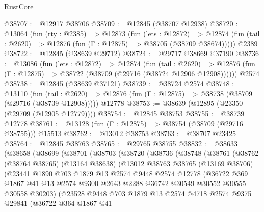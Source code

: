 \begin{lexlean}{RustCore}
\begin{coremodule}
@38707 := @12917 @38706
@38709 := @12845 (@38707 @12938)
@38720 := @13064
    (fun (rty : @2385) =>
    @12873
      (fun (lets : @12872) =>
      @12874 (fun (tail : @2620) => @12876 (fun (Γ : @12875) => @38705 (@38709 @38674)))))
    @2389
@38722 := @12845 (@38639 @29712)
@38724 := @29717 @38669 @37190
@38736 := @13086
    (fun (lets : @12872) =>
    @12874
      (fun (tail : @2620) =>
      @12876 (fun (Γ : @12875) => @38722 (@38709 (@29716 (@38724 @12906 @12908))))))
    @2574
@38738 := @12845 (@38639 @37121)
@38739 := @38724 @2574
@38748 := @13110
    (fun (tail : @2620) => @12876 (fun (Γ : @12875) => @38738 (@38709 (@29716 (@38739 @12908)))))
    @12778
@38753 := @38639 (@12895 (@23350 (@29709 (@12905 @12779))))
@38754 := @12845 @38753
@38755 := @38739 @12778
@38761 := @13128 (fun (Γ : @12875) => @38754 (@38709 (@29716 @38755))) @15513
@38762 := @13012 @38753
@38763 := @38707 @23425
@38764 := @12845 @38763
@38765 := @29765 @38755
@38832 := @38633
    (@38658
      (@38699
        (@38701
          (@38703
            (@38720
              (@38736
                (@38748
                  (@38761
                    (@38762
                      (@38764 @38765)
                      (@13164 @38638)
                      (@13012
                        @38763
                        @38765
                        (@13169 @38706)
                        (@23441
                          @1890
                          @703
                          @1879
                          @13
                          @2574
                          @9448
                          @2574
                          @12778
                          (@36722
                            @369
                            @1867
                            @41
                            @13
                            @2574
                            @9300
                            @2643
                            @2288
                            @36742
                            @30549
                            @30552
                            @30555
                            @30558
                            @30203)
                          (@23528
                            @9448
                            @703
                            @1879
                            @13
                            @2574
                            @4718
                            @2574
                            @9375
                            @29841
                            (@36722
                              @364
                              @1867
                              @41

\end{coremodule}
\end{lexlean}
